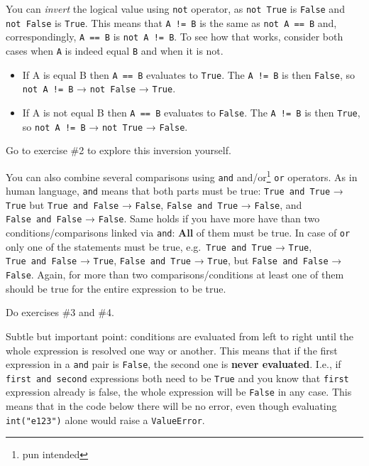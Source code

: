 \documentclass[
]{book}
\providecommand{\tightlist}{%
  \setlength{\itemsep}{0pt}\setlength{\parskip}{0pt}}
\begin{document}
You can \emph{invert} the logical value using \texttt{not} operator, as \texttt{not\ True} is \texttt{False} and \texttt{not\ False} is \texttt{True}. This means that \texttt{A\ !=\ B} is the same as \texttt{not\ A\ ==\ B} and, correspondingly, \texttt{A\ ==\ B} is \texttt{not\ A\ !=\ B}. To see how that works, consider both cases when \texttt{A} is indeed equal \texttt{B} and when it is not.

\begin{itemize}
\tightlist
\item
  If A is equal B then \texttt{A\ ==\ B} evaluates to \texttt{True}. The \texttt{A\ !=\ B} is then \texttt{False}, so \texttt{not\ A\ !=\ B} → \texttt{not\ False} → \texttt{True}.
\item
  If A is not equal B then \texttt{A\ ==\ B} evaluates to \texttt{False}. The \texttt{A\ !=\ B} is then \texttt{True}, so \texttt{not\ A\ !=\ B} → \texttt{not\ True} → \texttt{False}.
\end{itemize}

Go to exercise \#2 to explore this inversion yourself.

You can also combine several comparisons using \texttt{and} and/or\footnote{pun intended} \texttt{or} operators. As in human language, \texttt{and} means that both parts must be true: \texttt{True\ and\ True} → \texttt{True} but \texttt{True\ and\ False} → \texttt{False}, \texttt{False\ and\ True} → \texttt{False}, and \texttt{False\ and\ False} → \texttt{False}. Same holds if you have more have than two conditions/comparisons linked via \texttt{and}: \textbf{All} of them must be true. In case of \texttt{or} only one of the statements must be true, e.g.~\texttt{True\ and\ True} → \texttt{True}, \texttt{True\ and\ False} → \texttt{True}, \texttt{False\ and\ True} → \texttt{True}, but \texttt{False\ and\ False} → \texttt{False}. Again, for more than two comparisons/conditions at least one of them should be true for the entire expression to be true.

Do exercises \#3 and \#4.

Subtle but important point: conditions are evaluated from left to right until the whole expression is resolved one way or another. This means that if the first expression in a \texttt{and} pair is \texttt{False}, the second one is \textbf{never evaluated}. I.e., if \texttt{first\ and\ second} expressions both need to be \texttt{True} and you know that \texttt{first} expression already is false, the whole expression will be \texttt{False} in any case. This means that in the code below there will be no error, even though evaluating \texttt{int("e123")} alone would raise a \texttt{ValueError}.
\end{document}
